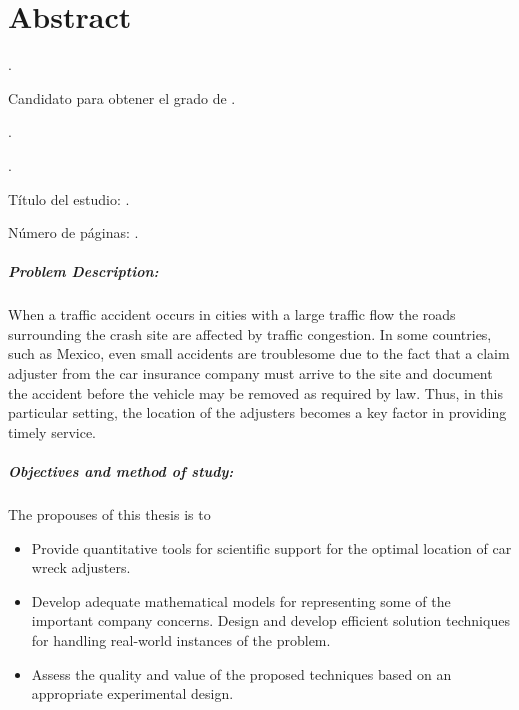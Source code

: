 
\chapter{Abstract}

{\setlength{\leftskip}{10mm}
\setlength{\parindent}{-10mm}

\autor.

Candidato para obtener el grado de \grado\orientacion.

\uanl.

\fime.

Título del estudio: \textsc{\titulo}.

\noindent Número de páginas: \pageref*{lastpage}.}

\paragraph{Problem Description:}
When a traffic accident occurs
in cities with a large traffic flow
the roads surrounding the crash site
are affected by traffic congestion.
In some countries, such as Mexico,
even small accidents are troublesome
due to the fact
that a claim adjuster
from the car insurance company
must arrive to the site
and document the accident
before the vehicle may be removed
as required by law.
Thus,
in this particular setting,
the location of the adjusters
becomes a key factor in providing timely service.

\paragraph{Objectives and method of study:}
The propouses of this thesis is to
\begin{itemize}
\item Provide quantitative tools
for scientific support
for the optimal location
of car wreck adjusters.
\item Develop
adequate mathematical models
for representing
some of the important company concerns.
Design and develop efficient solution techniques
for handling real-world instances of the problem.
\item Assess
the quality and value of the proposed techniques
based on an appropriate experimental design.
\end{itemize}

